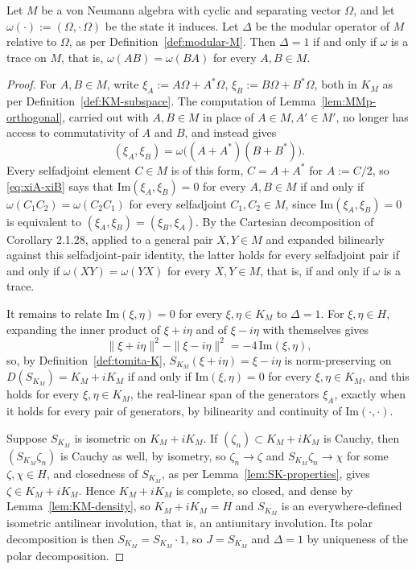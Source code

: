 \begin{proposition}\label{prop:Delta-trivial-tracial}
	Let $M$ be a von Neumann algebra with cyclic and separating vector $\Omega$, and let $\omega(\cdot) := (\Omega,\cdot\,\Omega)$ be the state it induces. Let $\Delta$ be the modular operator of $M$ relative to $\Omega$, as per Definition~\ref{def:modular-M}. Then $\Delta = 1$ if and only if $\omega$ is a trace on $M$, that is, $\omega(AB) = \omega(BA)$ for every $A,B \in M$.
\end{proposition}

\begin{proof}
	For $A,B \in M$, write $\xi_A := A\Omega+A^*\Omega$, $\xi_B := B\Omega+B^*\Omega$, both in $K_M$ as per Definition~\ref{def:KM-subspace}. The computation of Lemma~\ref{lem:MMp-orthogonal}, carried out with $A,B \in M$ in place of $A \in M, A' \in M'$, no longer has access to commutativity of $A$ and $B$, and instead gives
	\begin{equation}\label{eq:xiA-xiB}
		(\xi_A,\xi_B) = \omega\big((A+A^*)(B+B^*)\big).
	\end{equation}
	Every selfadjoint element $C \in M$ is of this form, $C=A+A^*$ for $A:=C/2$, so \eqref{eq:xiA-xiB} says that $\mathrm{Im}(\xi_A,\xi_B)=0$ for every $A,B\in M$ if and only if $\omega(C_1C_2)=\omega(C_2C_1)$ for every selfadjoint $C_1,C_2 \in M$, since $\mathrm{Im}(\xi_A,\xi_B)=0$ is equivalent to $(\xi_A,\xi_B)=(\xi_B,\xi_A)$. By the Cartesian decomposition of Corollary 2.1.28, applied to a general pair $X,Y\in M$ and expanded bilinearly against this selfadjoint-pair identity, the latter holds for every selfadjoint pair if and only if $\omega(XY)=\omega(YX)$ for every $X,Y \in M$, that is, if and only if $\omega$ is a trace.
	
	It remains to relate $\mathrm{Im}(\xi,\eta)=0$ for every $\xi,\eta \in K_M$ to $\Delta=1$. For $\xi,\eta \in H$, expanding the inner product of $\xi+i\eta$ and of $\xi-i\eta$ with themselves gives
	\[
	\|\xi+i\eta\|^2 - \|\xi-i\eta\|^2 = -4\,\mathrm{Im}(\xi,\eta),
	\]
	so, by Definition~\ref{def:tomita-K}, $S_{K_M}(\xi+i\eta)=\xi-i\eta$ is norm-preserving on $D(S_{K_M})=K_M+iK_M$ if and only if $\mathrm{Im}(\xi,\eta)=0$ for every $\xi,\eta\in K_M$, and this holds for every $\xi,\eta \in K_M$, the real-linear span of the generators $\xi_A$, exactly when it holds for every pair of generators, by bilinearity and continuity of $\mathrm{Im}(\cdot,\cdot)$.
	
	Suppose $S_{K_M}$ is isometric on $K_M+iK_M$. If $(\zeta_n)\subset K_M+iK_M$ is Cauchy, then $(S_{K_M}\zeta_n)$ is Cauchy as well, by isometry, so $\zeta_n\to\zeta$ and $S_{K_M}\zeta_n\to\chi$ for some $\zeta,\chi\in H$, and closedness of $S_{K_M}$, as per Lemma~\ref{lem:SK-properties}, gives $\zeta\in K_M+iK_M$. Hence $K_M+iK_M$ is complete, so closed, and dense by Lemma~\ref{lem:KM-density}, so $K_M+iK_M=H$ and $S_{K_M}$ is an everywhere-defined isometric antilinear involution, that is, an antiunitary involution. Its polar decomposition is then $S_{K_M}=S_{K_M}\cdot 1$, so $J=S_{K_M}$ and $\Delta=1$ by uniqueness of the polar decomposition.
	

\end{proof}
